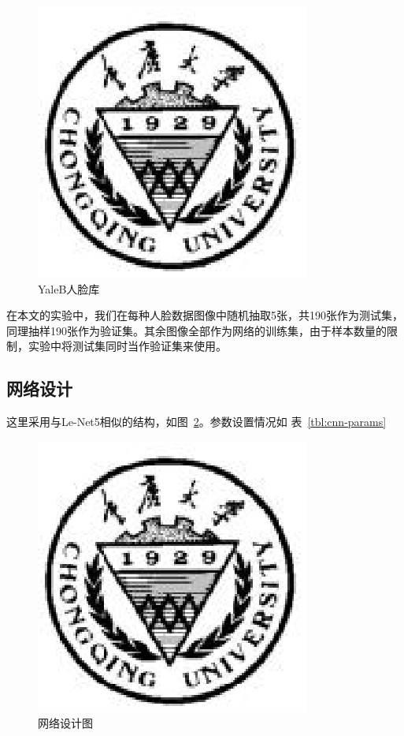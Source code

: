 \documentclass[bachelor,zhspacing]{cqu}  %
\begin{document}
\begin{figure}[htbp]
\centering
\includegraphics{./pic/cqu.eps}
\caption{YaleB人脸库}\label{fig:yaleb}
\end{figure}

在本文的实验中，我们在每种人脸数据图像中随机抽取5张，共190张作为测试集，同理抽样190张作为验证集。其余图像全部作为网络的训练集，由于样本数量的限制，实验中将测试集同时当作验证集来使用。

\subsection{网络设计}\label{ux7f51ux7edcux8bbeux8ba1}

这里采用与Le-Net5相似的结构，如图~\ref{fig:cnn-net}。参数设置情况如
表~\ref{tbl:cnn-params}

\begin{figure}[htbp]
\centering
\includegraphics{./pic/cqu.eps}
\caption{网络设计图}\label{fig:cnn-net}
\end{figure}
\end{document}
